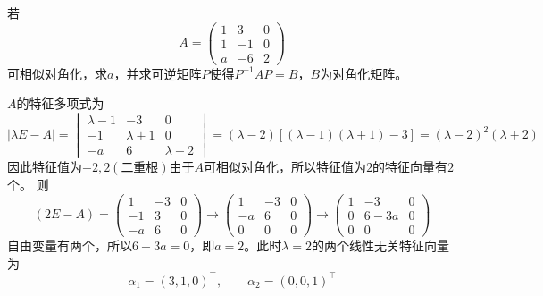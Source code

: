 \begin{example}
    若
    \[
        A =
        \begin{pmatrix}
            1 & 3  & 0 \\
            1 & -1 & 0 \\
            a & -6 & 2
        \end{pmatrix}
    \]
    可相似对角化，求$a$，并求可逆矩阵$P$使得$P^{-1}AP=B$，$B$为对角化矩阵。
\end{example}
\begin{solution}
    $A$的特征多项式为
    \[
        |\lambda E-A| =
        \begin{vmatrix}
            \lambda-1 & -3        & 0         \\
            -1        & \lambda+1 & 0         \\
            -a        & 6         & \lambda-2
        \end{vmatrix}
        =(\lambda-2)[(\lambda-1)(\lambda+1)-3]
        =(\lambda-2)^2(\lambda+2)
    \]
    因此特征值为$-2,2(\text{二重根})$由于$A$可相似对角化，所以特征值为$2$的特征向量有$2$个。
    则
    \[
        (2E-A) =
        \begin{pmatrix}
            1  & -3 & 0 \\
            -1 & 3  & 0 \\
            -a & 6  & 0
        \end{pmatrix}
        \longrightarrow
        \begin{pmatrix}
            1  & -3 & 0 \\
            -a & 6  & 0 \\
            0  & 0  & 0
        \end{pmatrix}
        \longrightarrow
        \begin{pmatrix}
            1 & -3   & 0 \\
            0 & 6-3a & 0 \\
            0 & 0    & 0
        \end{pmatrix}
    \]
    自由变量有两个，所以$6-3a=0$，即$a=2$。此时$\lambda=2$的两个线性无关特征向量为
    \[ \alpha_1 = (3,1,0)^\intercal ,\qquad \alpha_2 = (0,0,1)^\intercal \]


\end{solution}
